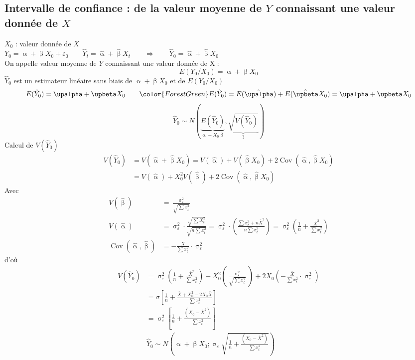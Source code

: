 \documentclass{article}
\newcommand{\hbeta}{\hat{\upbeta}}
\newcommand{\halpha}{\hat{\upalpha}}
\newcommand{\sig}{\upsigma_\varepsilon^2}
\begin{document}
 \subsection{Intervalle de confiance : de la valeur moyenne de $Y$ connaissant une valeur donnée de $X$}
 $X_0$ : valeur donnée de $X$\\
 $Y_0 = \upalpha + \upbeta X_0 + \varepsilon_0 \qquad \hat{Y}_t = \halpha + \hbeta X_t \qquad \Rightarrow \qquad \hat{Y}_0  = \halpha + \hbeta X_0$ \\
 On appelle valeur moyenne de $Y$ connaissant une valeur donnée de X : 
 \[E\left(Y_0/X_0\right) = \upalpha + \upbeta X_0\]
 $\hat{Y}_0$ est un estimateur linéaire sans biais de $\upalpha + \upbeta X_0$ et de $E\left(Y_0/X_0\right)$
 \[E(\hat{Y}_0) = \upalpha + \upbeta X_0 \qquad {\color{ForestGreen}E(\hat{Y}_0) = E(\halpha) + E(\hbeta X_0) = \upalpha + \upbeta X_0}\]
 \[\hat{Y}_0 \sim N\left(\underbrace{E\left(\hat{Y}_0\right)}_{\upalpha + X_0 \upbeta}, \underbrace{\sqrt{V\left(\hat{Y}_0\right)}}_?\right)\]
 Calcul de $V(\hat{Y}_0)$
 \begin{equation*}
 	\begin{split}
 	V(\hat{Y}_0) &= V(\halpha + \hbeta	X_0) = V(\halpha) + V(\hbeta X_0) + 2 \operatorname{Cov} (\halpha, \hbeta X_0) \\
 	&= V(\halpha) + X_0^2 V(\hbeta) + 2 \operatorname{Cov} (\halpha, \hbeta X_0) 	
 	\end{split}
 \end{equation*}
 Avec
 \begin{equation*}
 \begin{split}
 V(\hbeta) &= \frac{\sig}{\sqrt{\sum x_t^2}} \\
 V(\halpha) &= \sig \cdot \frac{\sqrt{\sum X_t^2}}{\sqrt{n \sum x_t^2}} = \sig \cdot \left(\frac{\sum x_t^2 + n \overline{X}^2}{n \sum x_t^2}\right) = \sig \left(\frac{1}{n} + \frac{\overline{X}^2}{\sum x_t^2}\right) \\
 \operatorname{Cov} (\halpha, \hbeta) &= - \frac{\overline{X}}{\sum x_t^2} \cdot \sig 	
 \end{split}
 \end{equation*}
 d'où
 \begin{equation*}
 	\begin{split}
		V(\hat{Y}_0) &= \sig \left(\frac{1}{n} + \frac{\overline{X}^2}{\sum x_t^2}\right) + X_0^2 \left(\frac{\sig}{\sqrt{\sum x_t^2}}\right) + 2 X_0 \left(- \frac{\overline{X}}{\sum x_t^2} \cdot \sig 	\right) \\
		&= \sigma \left[\frac{1}{n} + \frac{\overline{X} + X_0^2 - 2 X_0\overline{X}}{\sum x_t^2}\right] \\
		&= \sig \left[\frac{1}{n} + \frac{(X_0-\overline{X}^2)}{\sum x_t^2}\right] \\
		&\boxed{\hat{Y}_0 \sim N \left(\upalpha + \upbeta X_0 ;  \upsigma_\varepsilon \sqrt{\frac{1}{n} + \frac{(X_0-\overline{X}^2)}{\sum x_t^2}}\right)}
 	\end{split}
 \end{equation*}
\end{document}
